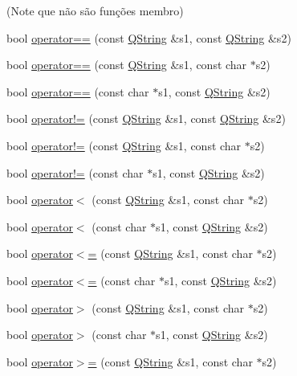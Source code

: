 (Note que não são funções membro) \begin{DoxyCompactItemize}
\item 
bool \hyperlink{class_q_string_acdeb7d77a324fe69b0e5889ff8575400}{operator==} (const \hyperlink{class_q_string}{Q\-String} \&s1, const \hyperlink{class_q_string}{Q\-String} \&s2)
\item 
bool \hyperlink{class_q_string_af35a5ca71a731a8ecf66c62a74123be2}{operator==} (const \hyperlink{class_q_string}{Q\-String} \&s1, const char $\ast$s2)
\item 
bool \hyperlink{class_q_string_af13dfeb5517343bb511393c74f18a3b6}{operator==} (const char $\ast$s1, const \hyperlink{class_q_string}{Q\-String} \&s2)
\item 
bool \hyperlink{class_q_string_aaeae05f02ef07005a07ac285706920dd}{operator!=} (const \hyperlink{class_q_string}{Q\-String} \&s1, const \hyperlink{class_q_string}{Q\-String} \&s2)
\item 
bool \hyperlink{class_q_string_a77e694c60b1699442a3f13e8bbc0c4a9}{operator!=} (const \hyperlink{class_q_string}{Q\-String} \&s1, const char $\ast$s2)
\item 
bool \hyperlink{class_q_string_aba83e5b91872eeb6af5f55d7b96ab50b}{operator!=} (const char $\ast$s1, const \hyperlink{class_q_string}{Q\-String} \&s2)
\item 
bool \hyperlink{class_q_string_abe479c7e9bb723be856c1bcc388fb50f}{operator$<$} (const \hyperlink{class_q_string}{Q\-String} \&s1, const char $\ast$s2)
\item 
bool \hyperlink{class_q_string_ad25d50b4f92864191c30a5a76e7894b8}{operator$<$} (const char $\ast$s1, const \hyperlink{class_q_string}{Q\-String} \&s2)
\item 
bool \hyperlink{class_q_string_a12eb758cb95c371ba27ef75d82c2ec86}{operator$<$=} (const \hyperlink{class_q_string}{Q\-String} \&s1, const char $\ast$s2)
\item 
bool \hyperlink{class_q_string_a98d7107dd1903d01a5fabeab999fe398}{operator$<$=} (const char $\ast$s1, const \hyperlink{class_q_string}{Q\-String} \&s2)
\item 
bool \hyperlink{class_q_string_ab0ce893122b9d85769be403013196aed}{operator$>$} (const \hyperlink{class_q_string}{Q\-String} \&s1, const char $\ast$s2)
\item 
bool \hyperlink{class_q_string_a382b1ef4a8de8768259b825b534fcda1}{operator$>$} (const char $\ast$s1, const \hyperlink{class_q_string}{Q\-String} \&s2)
\item 
bool \hyperlink{class_q_string_a19a6ef539052453895b39db1f25ec5a2}{operator$>$=} (const \hyperlink{class_q_string}{Q\-String} \&s1, const char $\ast$s2)

\end{DoxyCompactItemize}
